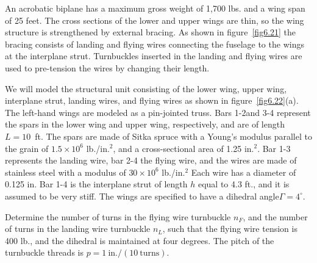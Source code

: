 \documentclass{AeroStructure-ERJohnson}
\begin{document}
\begin{example*}\label{ex6.10}An acrobatic biplane has a maximum gross weight of 1,700 lbs. and a wing span of 25 feet. The cross sections of the lower and upper wings are thin, so the wing structure is strengthened by external bracing. As shown in figure~\ref{fig6.21} the bracing consists of landing and flying wires connecting the fuselage to the wings at the interplane strut. Turnbuckles inserted in the landing and flying wires are used to pre-tension the wires by changing their length.


We will model the structural unit consisting of the lower wing, upper wing, interplane strut, landing wires, and flying wires as shown in figure~\ref{fig6.22}(a). The left-hand wings are modeled as a pin-jointed truss.\vadjust{\vspace*{10pt}\pagebreak} Bars 1-2\break and 3-4 represent the spars in the lower wing and upper wing, respectively, and are of length $L = 10$~ft. The spars are made of Sitka spruce with a Young's modulus parallel to the grain of $1.5 \times 10^{6}$ lb./in.$^2$, and a cross-sectional area of 1.25 in.$^2$. Bar 1-3 represents the landing wire, bar 2-4 the flying wire, and the wires are made of stainless steel with a modulus of $30 \times 10^{6}$ lb./in.$^2$ Each wire has a diameter of 0.125 in. Bar 1-4 is the interplane strut of length $h$ equal to 4.3 ft., and it is assumed to be very stiff. The wings are specified to have a dihedral angle\break $\Gamma=4^{\circ}$.

Determine the number of turns in the flying wire turnbuckle $n_{F}$, and the number of turns in the landing wire turnbuckle $n_{L}$, such that the flying wire tension is 400 lb., and the dihedral is maintained at four degrees. The pitch of the turnbuckle threads is $p=1~\text {in.}/(10~\text {turns})$.



\end{example*}
\end{document}
